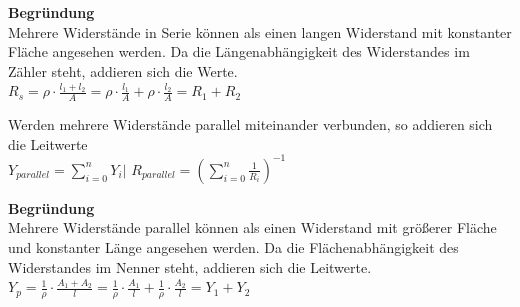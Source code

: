 							        \vspace{1em}

										\textbf{Begründung} \\
										Mehrere Widerstände in Serie können als einen langen Widerstand mit konstanter Fläche angesehen werden. Da die Längenabhängigkeit des Widerstandes im Zähler steht, addieren sich die Werte. \\
										$\displaystyle R_s = \rho \cdot \frac{l_1+l_2}{A} = \rho \cdot \frac{l_1}{A}  + \rho \cdot \frac{l_2}{A}  = R_1 + R_2 $
										\fix
										\begin{center}
										\end{center}
					\fix



										\beginip
										Werden mehrere Widerstände parallel miteinander verbunden, so addieren sich die Leitwerte \\
										\formulaBegin
										$\displaystyle Y_{parallel} = \sum_{i=0}^n Y_i \Bigg\rvert$
										$\displaystyle R_{parallel} = \left(\sum_{i=0}^n \frac{1}{R_i}\right)^{-1}$
										\formulaEnd
										\iend

					          \vspace{1em}

					          \textbf{Begründung} \\
										Mehrere Widerstände parallel können als einen Widerstand mit größerer Fläche und konstanter Länge angesehen werden. Da die Flächenabhängigkeit des Widerstandes im Nenner steht, addieren sich die Leitwerte. \\
											$\displaystyle Y_p = \frac{1}{\rho} \cdot \frac{A_1 + A_2}{l} = \frac{1}{\rho} \cdot \frac{A_1}{l}  + \frac{1}{\rho} \cdot \frac{A_2}{l}  = Y_1 + Y_2 $


